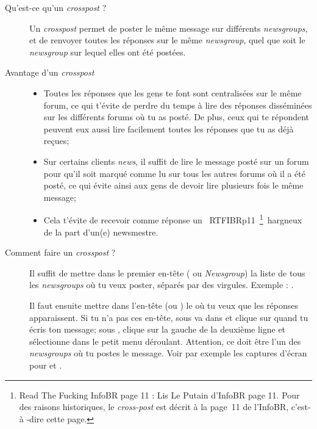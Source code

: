 \begin{description}

\item[Qu'est-ce qu'un \emph{crosspost} ?]
Un \emph{crosspost} permet de poster le m\^eme message sur diff\'erents \emph{newsgroups}, et de renvoyer toutes les r\'eponses sur le m\^eme \emph{newsgroup}, quel
que soit le \emph{newsgroup} sur lequel elles ont \'et\'e post\'ees.

\item[Avantage d'un \emph{crosspost}]
\begin{itemize}
 \item Toutes les r\'eponses que les gens te font sont centralis\'ees sur le m\^eme forum,
       ce qui t'\'evite de perdre du temps \`a  lire des r\'eponses diss\'emin\'ees
       sur les diff\'erents forums o\`u tu as post\'e.
       De plus, ceux qui te r\'epondent peuvent eux aussi lire facilement toutes les r\'eponses
       que tu as d\'ej\`a  re\c cues;
 \item Sur certains clients \emph{news}, il suffit de lire le message post\'e sur un forum
       pour qu'il soit marqu\'e comme lu sur tous les autres forums o\`u il a \'et\'e post\'e,
       ce qui \'evite ainsi aux gens de devoir lire plusieurs fois le m\^eme message;
 \item Cela t'\'evite de recevoir comme r\'eponse un \guillemotleft~RTFIBRp11~\footnote{Read The Fucking InfoBR page 11 : Lis Le Putain d'InfoBR page 11. Pour des raisons historiques, le \emph{cross-post} est d\'ecrit \`a  la page~11 de l'InfoBR, c'est-\`a -dire cette page.}~\guillemotright  hargneux de la part d'un(e) newsmestre.
\end{itemize}

\item[Comment faire un \emph{crosspost} ?]
Il suffit de mettre dans le premier en-t\^ete ( ou \emph{Newsgroup}) la liste de tous les \emph{newsgroups} o\`u tu veux
poster, s\'epar\'es par des virgules. Exemple : .

Il faut ensuite mettre dans l'en-t\^ete  (ou ) le  o\`u tu veux que les r\'eponses apparaissent. Si
tu n'a pas ces en-t\^ete, sous  va dans  et clique sur  quand tu \'ecris ton message; sous
, clique sur la gauche de la deuxi\`eme ligne et s\'electionne  dans le petit menu d\'eroulant. Attention, ce doit \^etre
l'un des \emph{newsgroups} o\`u tu postes le message.
Voir par exemple les captures d'\'ecran pour  et .\\


\end{description}
